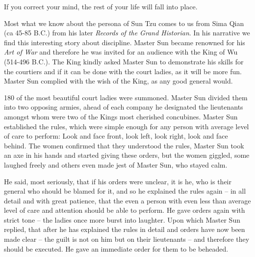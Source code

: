 \begin{quotex}
If you correct your mind, the rest of your life will fall into place.
\end{quotex}


Most what we know about the persona of Sun Tzu comes to us from Sima Qian (ca 45-85 B.C.) from his later \emph{Records of the Grand Historian}. In his narrative we find this interesting story about discipline. Master Sun became renowned for his \emph{Art of War} and therefore he was invited for an audience with the King of Wu (514-496 B.C.). The King kindly asked Master Sun to demonstrate his skills for the courtiers and if it can be done with the court ladies, as it will be more fun. Master Sun complied with the wish of the King, as any good general would.

180 of the most beautiful court ladies were summoned. Master Sun divided them into two opposing armies, ahead of each company he designated the lieutenants amongst whom were two of the Kings most cherished concubines. Master Sun established the rules, which were simple enough for any person with average level of care to perform: Look and face front, look left, look right, look and face behind. The women confirmed that they understood the rules, Master Sun took an axe in his hands and started giving these orders, but the women giggled, some laughed freely and others even made jest of Master Sun, who stayed calm.

He said, most seriously, that if his orders were unclear, it is he, who is their general who should be blamed for it, and so he explained the rules again -- in all detail and with great patience, that the even a person with even less than average level of care and attention should be able to perform. He gave orders again with strict tone -- the ladies once more burst into laughter. Upon which Master Sun replied, that after he has explained the rules in detail and orders have now been made clear -- the guilt is not on him but on their lieutenants -- and therefore they should be executed. He gave an immediate order for them to be beheaded.


